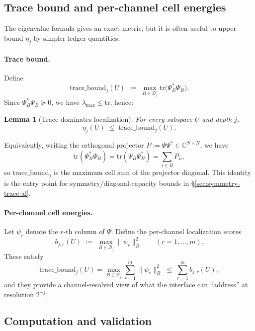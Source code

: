 \documentclass[11pt]{article}
\theoremstyle{plain}
\newtheorem{lemma}[theorem]{Lemma}
\theoremstyle{definition}
\theoremstyle{remark}
\newcommand{\C}{\mathbb{C}}
\begin{document}
\subsection{Trace bound and per-channel cell energies}\label{subsec:trace_bound}

The eigenvalue formula gives an exact metric, but it is often useful to upper bound \(\eta_j\) by simpler ledger quantities.

\paragraph{Trace bound.}
Define
\begin{equation}\label{eq:trace_bound_def}
\mathrm{trace\_bound}_j(U) \;:=\; \max_{B \in \mathcal{B}_j} \mathrm{tr}\!\bigl(\Psi_B^\ast \Psi_B\bigr).
\end{equation}
Since \(\Psi_B^\ast \Psi_B \succeq 0\), we have \(\lambda_{\max} \le \mathrm{tr}\), hence:

\begin{lemma}[Trace dominates localization]\label{lem:eta_le_trace}
For every subspace \(U\) and depth \(j\),
\[
\eta_j(U) \;\le\; \mathrm{trace\_bound}_j(U).
\]
\end{lemma}

\noindent
Equivalently, writing the orthogonal projector \(P := \Psi\Psi^\ast \in \C^{N\times N}\), we have
\[
\mathrm{tr}(\Psi_B^\ast \Psi_B)
= \mathrm{tr}(\Psi_B\Psi_B^\ast)
= \sum_{i\in B} P_{ii},
\]
so \(\mathrm{trace\_bound}_j\) is the maximum cell sum of the projector diagonal.
This identity is the entry point for symmetry/diagonal-capacity bounds in \S\ref{sec:symmetry-trace-al}.

\paragraph{Per-channel cell energies.}
Let \(\psi_r\) denote the \(r\)-th column of \(\Psi\).
Define the per-channel localization scores
\begin{equation}\label{eq:bj_def}
b_{j,r}(U) \;:=\; \max_{B \in \mathcal{B}_j} \|\psi_r\|_B^2
\qquad (r=1,\dots,m).
\end{equation}
These satisfy
\[
\mathrm{trace\_bound}_j(U)
= \max_{B \in \mathcal{B}_j} \sum_{r=1}^m \|\psi_r\|_B^2
\;\le\; \sum_{r=1}^m b_{j,r}(U),
\]
and they provide a channel-resolved view of what the interface can ``address'' at resolution \(2^{-j}\).

\subsection{Computation and validation}\label{subsec:eta_computation}
\end{document}
